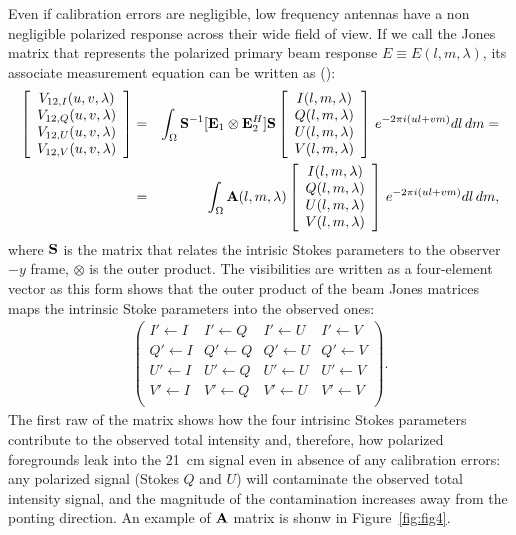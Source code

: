 \begin{itemize}
Even if calibration errors are negligible, low frequency antennas have a non negligible polarized response across their wide field of view. If we call the Jones matrix that represents the polarized primary beam response $E \equiv E (l,m,\lambda)$, its associate measurement equation can be written as (\cite{nunhokee17}):
\begin{eqnarray}
    \left[ 
    \begin{array}{cc}
    V_{12,I} (u,v,\lambda)\\
    V_{12,Q} (u,v,\lambda)\\
    V_{12,U} (u,v,\lambda)\\
    V_{12,V} (u,v,\lambda)
    \end{array}
    \right] & = & \int_\Omega{ {\bf S}^{-1} [ {\bf E}_1 \otimes {\bf E}_2^H ] {\bf S} 
    \left[ 
    \begin{array}{cc}
    I (l,m,\lambda)\\
    Q (l,m,\lambda)\\
    U (l,m,\lambda)\\
    V (l,m,\lambda)
    \end{array}
    \right]
     \, e^{-2 \pi i (ul + vm)} dl \, dm } = \nonumber \\
     & = & \int_\Omega{ {\bf A} (l,m,\lambda) 
    \left[ 
    \begin{array}{cc}
    I (l,m,\lambda)\\
    Q (l,m,\lambda)\\
    U (l,m,\lambda)\\
    V (l,m,\lambda)
    \end{array}
    \right]
     \, e^{-2 \pi i (ul + vm)} dl \, dm },
\label{eq:sec:8}
\end{eqnarray} 
where ${\bf S}$ is the matrix that relates the intrisic Stokes parameters to the observer $-y$ frame, $\otimes$ is the outer product. The visibilities are written as a four-element vector as this form shows that the outer product of the beam Jones matrices maps the intrinsic Stoke parameters into the observed ones: 
\begin{eqnarray}
    \left(
    \begin{array}{cccc}
    I' \leftarrow I & I' \leftarrow Q & I' \leftarrow U & I' \leftarrow V \\
    Q' \leftarrow I & Q' \leftarrow Q & Q' \leftarrow U & Q' \leftarrow V \\
    U' \leftarrow I & U' \leftarrow Q & U' \leftarrow U & U' \leftarrow V \\
    V' \leftarrow I & V' \leftarrow Q & V' \leftarrow U & V' \leftarrow V \\
    \end{array}
    \right).
\label{eq:sec:8}
\end{eqnarray} 
The first raw of the matrix shows how the four intrisinc Stokes parameters contribute to the observed total intensity and, therefore, how polarized foregrounds leak into the 21~cm signal even in absence of any calibration errors: any polarized signal (Stokes $Q$ and $U$) will contaminate the observed total intensity signal, and the magnitude of the contamination increases away from the ponting direction. An example of $\bf A$ matrix is shonw in Figure~\ref{fig:fig4}.


\end{itemize}
